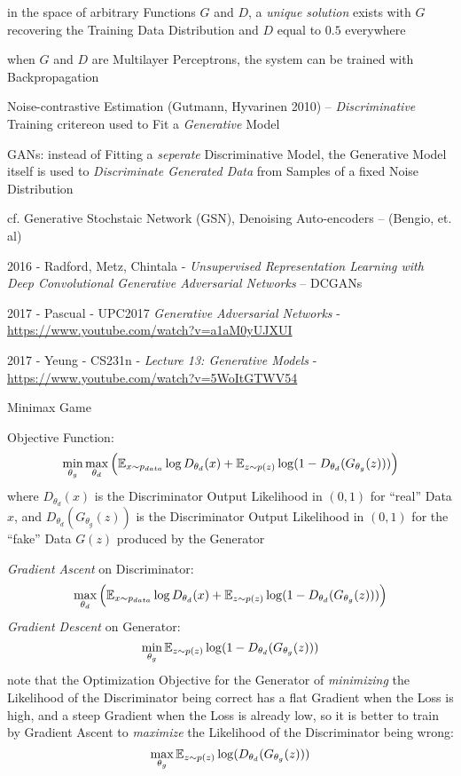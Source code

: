 in the space of arbitrary Functions $G$ and $D$, a \emph{unique solution} exists
with $G$ recovering the Training Data Distribution and $D$ equal to $0.5$
everywhere

when $G$ and $D$ are Multilayer Perceptrons, the system can be trained with
Backpropagation

Noise-contrastive Estimation (Gutmann, Hyvarinen 2010) --
\emph{Discriminative} Training critereon used to Fit a \emph{Generative} Model

GANs: instead of Fitting a \emph{seperate} Discriminative Model, the Generative
Model itself is used to \emph{Discriminate Generated Data} from Samples of a
fixed Noise Distribution

cf. Generative Stochstaic Network (GSN), Denoising Auto-encoders --
(Bengio, et. al)

2016 - Radford, Metz, Chintala - \emph{Unsupervised Representation Learning with
  Deep Convolutional Generative Adversarial Networks} -- DCGANs

\asterism

2017 - Pascual - UPC2017 \emph{Generative Adversarial Networks} -
\url{https://www.youtube.com/watch?v=a1aM0yUJXUI}

2017 - Yeung - CS231n - \emph{Lecture 13: Generative Models} -
\url{https://www.youtube.com/watch?v=5WoItGTWV54}

Minimax Game

Objective Function:
\[
  \min_{\theta_g} \max_{\theta_d} \Big(
    \mathbb{E}_{x \sim p_{data}} \log D_{\theta_d}(x) +
    \mathbb{E}_{z \sim p(z)} \log (1 - D_{\theta_d}(G_{\theta_g}(z)))
  \Big)
\]
where $D_{\theta_d}(x)$ is the Discriminator Output Likelihood in $(0, 1)$ for
``real'' Data $x$, and $D_{\theta_d}(G_{\theta_g}(z))$ is the Discriminator
Output Likelihood in $(0, 1)$ for the ``fake'' Data $G(z)$ produced by the
Generator

\emph{Gradient Ascent} on Discriminator:
\[
  \max_{\theta_d} \Big(
    \mathbb{E}_{x \sim p_{data}} \log D_{\theta_d}(x) +
    \mathbb{E}_{z \sim p(z)} \log (1 - D_{\theta_d}(G_{\theta_g}(z)))
  \Big)
\]
\emph{Gradient Descent} on Generator:
\[
  \min_{\theta_g} \mathbb{E}_{z \sim p(z)} \log (1 - D_{\theta_d}(G_{\theta_g}(z)))
\]
note that the Optimization Objective for the Generator of \emph{minimizing} the
Likelihood of the Discriminator being correct has a flat Gradient when the Loss
is high, and a steep Gradient when the Loss is already low, so it is better to
train by Gradient Ascent to \emph{maximize} the Likelihood of the Discriminator
being wrong:
\[
  \max_{\theta_g} \mathbb{E}_{z \sim p(z)} \log (D_{\theta_d}(G_{\theta_g}(z)))
\]




